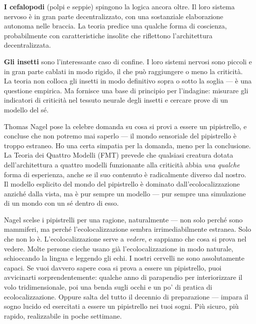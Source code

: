 \documentclass[11pt, twoside, openright]{book}
\begin{document}
\textbf{I cefalopodi} (polpi e seppie) spingono la logica ancora oltre. Il loro sistema nervoso è in gran parte decentralizzato, con una sostanziale elaborazione autonoma nelle braccia. La teoria predice una qualche forma di coscienza, probabilmente con caratteristiche insolite che riflettono l'architettura decentralizzata.

\textbf{Gli insetti} sono l'interessante caso di confine. I loro sistemi nervosi sono piccoli e in gran parte cablati in modo rigido, il che può raggiungere o meno la criticità. La teoria non colloca gli insetti in modo definitivo sopra o sotto la soglia --- è una questione empirica. Ma fornisce una base di principio per l'indagine: misurare gli indicatori di criticità nel tessuto neurale degli insetti e cercare prove di un modello del sé.

Thomas Nagel pose la celebre domanda su cosa si provi a essere un pipistrello, e concluse che non potremo mai saperlo --- il mondo sensoriale del pipistrello è troppo estraneo. Ho una certa simpatia per la domanda, meno per la conclusione. La Teoria dei Quattro Modelli (FMT) prevede che qualsiasi creatura dotata dell'architettura a quattro modelli funzionante alla criticità abbia \textit{una qualche} forma di esperienza, anche se il suo contenuto è radicalmente diverso dal nostro. Il modello esplicito del mondo del pipistrello è dominato dall'ecolocalizzazione anziché dalla vista, ma è pur sempre un modello --- pur sempre una simulazione di un mondo con un sé dentro di esso.

Nagel scelse i pipistrelli per una ragione, naturalmente --- non solo perché sono mammiferi, ma perché l'ecolocalizzazione sembra irrimediabilmente estranea. Solo che non lo è. L'ecolocalizzazione serve a \textit{vedere}, e sappiamo che cosa si prova nel vedere. Molte persone cieche usano già l'ecolocalizzazione in modo naturale, schioccando la lingua e leggendo gli echi. I nostri cervelli ne sono assolutamente capaci. Se vuoi davvero sapere cosa si prova a essere un pipistrello, puoi avvicinarti sorprendentemente: qualche anno di parapendio per interiorizzare il volo tridimensionale, poi una benda sugli occhi e un po' di pratica di ecolocalizzazione. Oppure salta del tutto il decennio di preparazione --- impara il sogno lucido ed esercitati a essere un pipistrello nei tuoi sogni. Più sicuro, più rapido, realizzabile in poche settimane.
\end{document}
